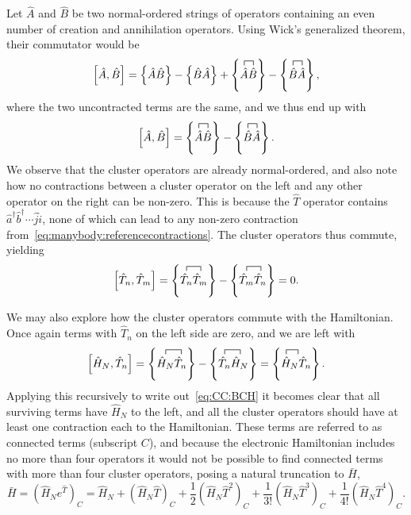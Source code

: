 Let $\hat{A}$ and $\hat{B}$ be two normal-ordered strings of operators containing an even number of creation and annihilation operators. Using Wick's generalized theorem, their commutator would be
\begin{equation}
\left[ \hat{A}, \hat{B} \right]
=
\left\lbrace \hat{A}\hat{B} \right\rbrace - \left\lbrace \hat{B}\hat{A} \right\rbrace
+
\left\lbrace
\contraction[1ex]{}{\hat{A}}{}{\hat{B}}
\hat{A}\hat{B} \right\rbrace
-
\left\lbrace
\contraction[1ex]{}{\hat{B}}{}{\hat{A}}
\hat{B}\hat{A} \right\rbrace ,
\end{equation}
where the two uncontracted terms are the same, and we thus end up with
\begin{equation}
\left[ \hat{A}, \hat{B} \right]
=
\left\lbrace
\contraction[1ex]{}{\hat{A}}{}{\hat{B}}
\hat{A}\hat{B} \right\rbrace
-
\left\lbrace
\contraction[1ex]{}{\hat{B}}{}{\hat{A}}
\hat{B}\hat{A} \right\rbrace .
\end{equation}
We observe that the cluster operators are already normal-ordered, and also note how no contractions between a cluster operator on the left and any other operator on the right can be non-zero.
This is because the $\hat{T}$ operator contains $\hat{a}^{\dagger} \hat{b}^{\dagger} \cdots \hat{j}\hat{i}$, none of which can lead to any non-zero contraction from~\eqref{eq:manybody:referencecontractions}.
The cluster operators thus commute, yielding
\begin{equation}
\left[ \hat{T}_n, \hat{T}_m \right]
=
\left\lbrace
\contraction[1ex]{}{\hat{T}_n}{}{\hat{T}_m}
\hat{T}_n \hat{T}_m \right\rbrace
-
\left\lbrace
\contraction[1ex]{}{\hat{T}_m}{}{\hat{T}_n}
\hat{T}_m \hat{T}_n \right\rbrace
=
0 .
\end{equation}

We may also explore how the cluster operators commute with the Hamiltonian.
Once again terms with $\hat{T}_n$ on the left side are zero, and we are left with
\begin{equation}
\left[ \hat{H}_N, \hat{T}_n \right]
=
\left\lbrace
\contraction[1ex]{}{\hat{H}_N}{}{\hat{T}_n}
\hat{H}_N \hat{T}_n \right\rbrace
-
\left\lbrace
\contraction[1ex]{}{\hat{T}_n}{}{\hat{H}_N}
\hat{T}_n \hat{H}_N \right\rbrace
=
\left\lbrace
\contraction[1ex]{}{\hat{H}}{}{\hat{T}_n}
\hat{H}_N \hat{T}_n \right\rbrace .
\end{equation}
Applying this recursively to write out~\eqref{eq:CC:BCH} it becomes clear that all surviving terms have $\hat{H}_N$ to the left, and all the cluster operators should have at least one contraction each to the Hamiltonian.
These terms are referred to as connected terms (subscript $\mathit{C}$), and because the electronic Hamiltonian includes no more than four operators it would not be possible to find connected terms with more than four cluster operators, posing a natural truncation to $\bar{H}$, 
\begin{equation}
\label{eq:CC:barhconn}
\bar{H} 
= \left(\hat{H}_N e^{\hat{T}} \right)_{\mathit{C}}
= \hat{H}_N 
+ \left( \hat{H}_N \hat{T} \right)_{\mathit{C}}
+\frac{1}{2} \left( \hat{H}_N \hat{T}^2 \right)_{\mathit{C}}
+\frac{1}{3!} \left( \hat{H}_N \hat{T}^3 \right)_{\mathit{C}}
+\frac{1}{4!} \left( \hat{H}_N \hat{T}^4 \right)_{\mathit{C}} .
\end{equation}


